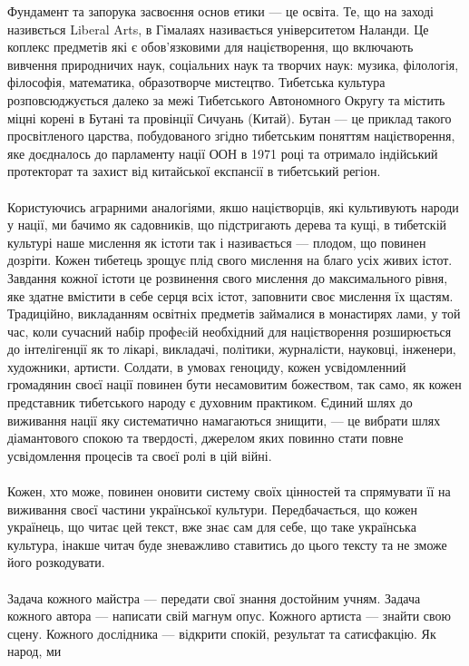 \newpage
Фундамент та запорука засвоєння основ етики --- це освіта. Те, що на заході
називється Liberal Arts, в Гімалаях називається університетом Наланди. Це
коплекс предметів які є обов'язковими для націєтворення, що включають
вивчення природничих наук, соціальних наук та творчих наук: музика, філологія, філософія,
математика, образотворче мистецтво. Тибетська культура розповсюджується далеко за межі
Тибетського Автономного Округу та містить міцні корені в Бутані та провінції Сичуань (Китай).
Бутан --- це приклад такого просвітленого царства, побудованого згідно тибетським поняттям
націєтворення, яке доєдналось до парламенту нації ООН в 1971 році та отримало індійський
протекторат та захист від китайської експансії в тибетський регіон.
\\
\\
Користуючись аграрними аналогіями, якшо націєтворців, які культивують народи
у нації, ми бачимо як садовників, що підстригають дерева та кущі, в тибетскій
культурі наше мислення як істоти так і називається --- плодом, що повинен
дозріти. Кожен тибетець зрощує плід свого мислення на благо усіх живих істот.
Завдання кожної істоти це розвинення свого мислення до максимального рівня,
яке здатне вмістити в себе серця всіх істот, заповнити своє мислення їх щастям.
Традиційно, викладанням освітніх предметів займалися в монастирях лами, у той
час, коли сучасний набір профеcій необхідний для націєтворення розширюється до
інтелігенції як то лікарі, викладачі, політики, журналісти, науковці, інженери,
художники, артисти. Солдати, в умовах геноциду, кожен усвідомленний громадянин
своєї нації повинен бути несамовитим божеством, так само, як кожен представник
тибетського народу є духовним практиком. Єдиний шлях до виживання нації яку
систематично намагаються знищити, --- це вибрати шлях діамантового спокою та твердості,
джерелом яких повинно стати повне усвідомлення процесів та своєї ролі в цій війні.
\\
\\
Кожен, хто може, повинен оновити систему своїх цінностей та спрямувати її на
виживання своєї частини української культури. Передбачається, що кожен українець,
що читає цей текст, вже знає сам для себе, що таке українська культура, інакше
читач буде зневажливо ставитись до цього тексту та не зможе його розкодувати.
\\
\\
Задача кожного майстра --- передати свої знання достойним учням. Задача кожного
автора --- написати свій магнум опус. Кожного артиста --- знайти свою сцену.
Кожного дослідника --- відкрити спокій, результат та сатисфакцію. Як народ, ми
